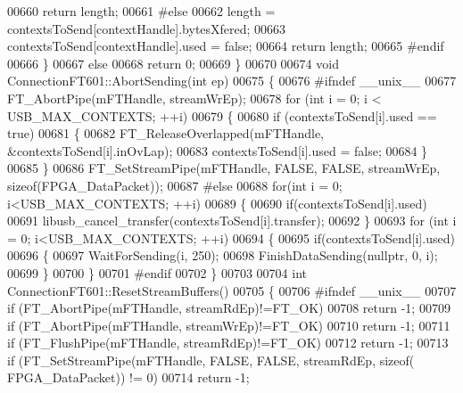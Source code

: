 \begin{DoxyCode}
{{{{{00660         \textcolor{keywordflow}{return} length;
00661 \textcolor{preprocessor}{#else}
00662         length = contextsToSend[contextHandle].bytesXfered;
00663         contextsToSend[contextHandle].used = \textcolor{keyword}{false};
00664         \textcolor{keywordflow}{return} length;
00665 \textcolor{preprocessor}{#endif}
00666     \}
00667     \textcolor{keywordflow}{else}
00668         \textcolor{keywordflow}{return} 0;
00669 \}
00670 
00674 \textcolor{keywordtype}{void} ConnectionFT601::AbortSending(\textcolor{keywordtype}{int} ep)
00675 \{
00676 \textcolor{preprocessor}{#ifndef \_\_unix\_\_}
00677     FT\_AbortPipe(mFTHandle, streamWrEp);
00678     \textcolor{keywordflow}{for} (\textcolor{keywordtype}{int} i = 0; i < USB\_MAX\_CONTEXTS; ++i)
00679     \{
00680         \textcolor{keywordflow}{if} (contextsToSend[i].used == \textcolor{keyword}{true})
00681         \{
00682             FT\_ReleaseOverlapped(mFTHandle, &contextsToSend[i].inOvLap);
00683             contextsToSend[i].used = \textcolor{keyword}{false};
00684         \}
00685     \}
00686     FT\_SetStreamPipe(mFTHandle, FALSE, FALSE, streamWrEp, \textcolor{keyword}{sizeof}(FPGA_DataPacket));
00687 \textcolor{preprocessor}{#else}
00688     \textcolor{keywordflow}{for}(\textcolor{keywordtype}{int} i = 0; i<USB\_MAX\_CONTEXTS; ++i)
00689     \{
00690         \textcolor{keywordflow}{if}(contextsToSend[i].used)
00691             libusb\_cancel\_transfer(contextsToSend[i].transfer);
00692     \}
00693     \textcolor{keywordflow}{for} (\textcolor{keywordtype}{int} i = 0; i<USB\_MAX\_CONTEXTS; ++i)
00694     \{
00695         \textcolor{keywordflow}{if}(contextsToSend[i].used)
00696         \{
00697             WaitForSending(i, 250);
00698             FinishDataSending(\textcolor{keyword}{nullptr}, 0, i);
00699         \}
00700     \}
00701 \textcolor{preprocessor}{#endif}
00702 \}
00703 
00704 \textcolor{keywordtype}{int} ConnectionFT601::ResetStreamBuffers()
00705 \{
00706 \textcolor{preprocessor}{#ifndef \_\_unix\_\_}
00707     \textcolor{keywordflow}{if} (FT\_AbortPipe(mFTHandle, streamRdEp)!=FT_OK)
00708         \textcolor{keywordflow}{return} -1;
00709     \textcolor{keywordflow}{if} (FT\_AbortPipe(mFTHandle, streamWrEp)!=FT_OK)
00710         \textcolor{keywordflow}{return} -1;
00711     \textcolor{keywordflow}{if} (FT\_FlushPipe(mFTHandle, streamRdEp)!=FT_OK)
00712         \textcolor{keywordflow}{return} -1;
00713     \textcolor{keywordflow}{if} (FT\_SetStreamPipe(mFTHandle, FALSE, FALSE, streamRdEp, \textcolor{keyword}{sizeof}(
      FPGA_DataPacket)) != 0)
00714         \textcolor{keywordflow}{return} -1;
}}}}}
\end{DoxyCode}
